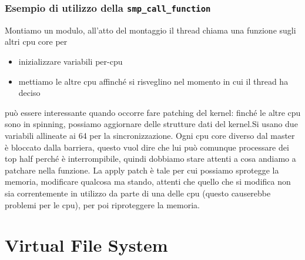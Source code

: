 \documentclass[12pt, oneside]{extbook}
\begin{document}
\subsection*{Esempio di utilizzo della \texttt{smp\_call\_function}}
Montiamo un modulo, all'atto del montaggio il thread chiama una funzione sugli altri cpu core per
\begin{itemize}
\item inizializzare variabili per-cpu
\item mettiamo le altre cpu affinché si risveglino nel momento in cui il thread ha deciso
\end{itemize}
può essere interessante quando occorre fare patching del kernel: finché le altre cpu sono in spinning, possiamo aggiornare delle strutture dati del kernel.Si usano due variabili allineate ai 64 per la sincronizzazione. Ogni cpu core diverso dal master è bloccato dalla barriera, questo vuol dire che lui può comunque processare dei top half perché è interrompibile, quindi dobbiamo stare attenti a cosa andiamo a patchare nella funzione. La apply patch è tale per cui possiamo sprotegge la memoria, modificare qualcosa ma stando, attenti che quello che si modifica non sia correntemente in utilizzo da parte di una delle cpu (questo causerebbe problemi per le cpu), per poi riproteggere la memoria.
\chapter{Virtual File System}
\end{document}
